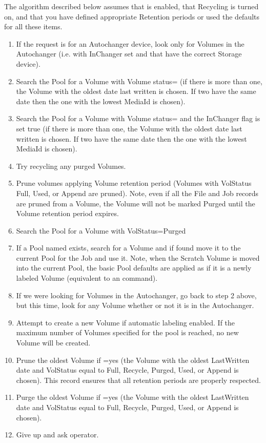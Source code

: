 The algorithm described below assumes that  is enabled,
that Recycling is turned on, and that you have defined
appropriate Retention periods or used the defaults for all these
items.

\begin{enumerate}
\item If the request is for an Autochanger device, look only
   for Volumes in the Autochanger (i.e. with InChanger set and that have
   the correct Storage device).
\item Search the Pool for a Volume with Volume status= (if there is more
   than one, the Volume with the oldest date last written is chosen.  If
   two have the same date then the one with the lowest MediaId is chosen).
\item Search the Pool for a Volume with Volume status= and the InChanger
   flag is set true (if there is more than one, the Volume with the oldest
   date last written is chosen.  If two have the same date then the one
   with the lowest MediaId is chosen).
\item Try recycling any purged Volumes.
\item Prune volumes applying Volume retention period (Volumes with VolStatus
   Full, Used, or Append are pruned). Note, even if all the File and Job
   records are pruned from a Volume, the Volume will not be marked Purged
   until the Volume retention period expires.
\item Search the Pool for a Volume with VolStatus=Purged
\item If a Pool named  exists, search for a Volume and if found
   move it to the current Pool for the Job and use it. Note, when
   the Scratch Volume is moved into the current Pool, the basic
   Pool defaults are applied as if it is a newly labeled Volume
   (equivalent to an  command).
\item If we were looking for Volumes in the Autochanger, go back to
   step 2 above, but this time, look for any Volume whether or not
   it is in the Autochanger.
\item Attempt to create a new Volume if automatic labeling enabled.
   If the maximum number of Volumes
   specified for the pool is reached, no new Volume will be created.
\item Prune the oldest Volume if =yes (the Volume with the
   oldest LastWritten date and VolStatus equal to  Full, Recycle, Purged, Used,
   or Append is chosen). This  record ensures that all retention periods are
   properly respected.
\item Purge the oldest Volume if =yes (the Volume  with the
   oldest LastWritten date and VolStatus equal to  Full, Recycle, Purged, Used,
   or Append is chosen).
\item Give up and ask operator.
\end{enumerate}


